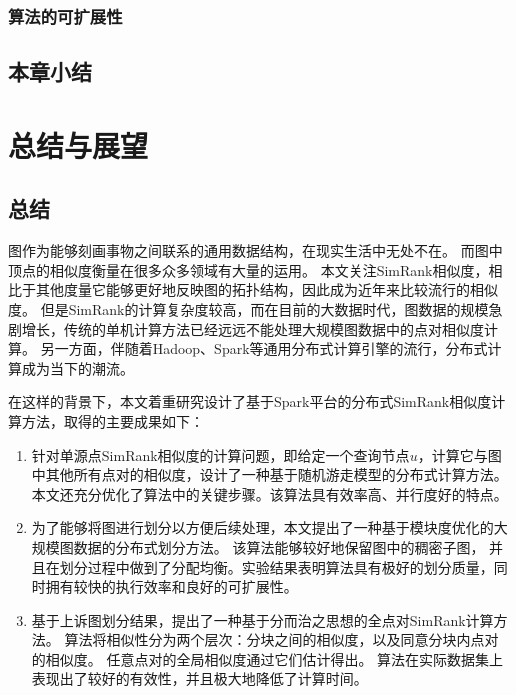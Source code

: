 \documentclass[master]{njuthesis}
\begin{document}
\subsection{算法的可扩展性}

\section{本章小结}


\chapter{总结与展望}\label{chapter_concludes}
\section{总结}
图作为能够刻画事物之间联系的通用数据结构，在现实生活中无处不在。
而图中顶点的相似度衡量在很多众多领域有大量的运用。
本文关注SimRank相似度，相比于其他度量它能够更好地反映图的拓扑结构，因此成为近年来比较流行的相似度。
但是SimRank的计算复杂度较高，而在目前的大数据时代，图数据的规模急剧增长，传统的单机计算方法已经远远不能处理大规模图数据中的点对相似度计算。
另一方面，伴随着Hadoop、Spark等通用分布式计算引擎的流行，分布式计算成为当下的潮流。

在这样的背景下，本文着重研究设计了基于Spark平台的分布式SimRank相似度计算方法，取得的主要成果如下：
\begin{enumerate}
 \item 针对单源点SimRank相似度的计算问题，即给定一个查询节点$u$，计算它与图中其他所有点对的相似度，设计了一种基于随机游走模型的分布式计算方法。
 本文还充分优化了算法中的关键步骤。该算法具有效率高、并行度好的特点。
 \item 为了能够将图进行划分以方便后续处理，本文提出了一种基于模块度优化的大规模图数据的分布式划分方法。 该算法能够较好地保留图中的稠密子图，
 并且在划分过程中做到了分配均衡。实验结果表明算法具有极好的划分质量，同时拥有较快的执行效率和良好的可扩展性。
 \item 基于上诉图划分结果，提出了一种基于分而治之思想的全点对SimRank计算方法。 算法将相似性分为两个层次：分块之间的相似度，以及同意分块内点对的相似度。
 任意点对的全局相似度通过它们估计得出。 算法在实际数据集上表现出了较好的有效性，并且极大地降低了计算时间。
\end{enumerate}
\end{document}
